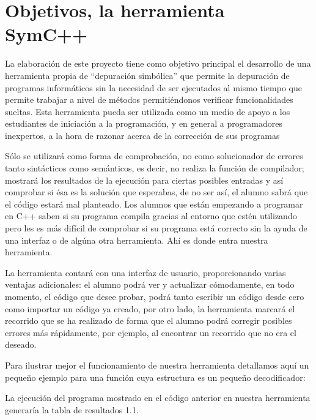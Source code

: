 \section{Objetivos, la herramienta SymC++}

La elaboraci\'on de este proyecto tiene como objetivo principal el desarrollo de una herramienta propia de ``depuraci\'on simb\'olica'' que permite la depuraci\'on de programas inform\'aticos sin la necesidad de ser ejecutados al mismo tiempo que permite trabajar a nivel de m\'etodos permiti\'endonos verificar funcionalidades sueltas. Esta herramienta pueda ser utilizada como un medio de apoyo a los estudiantes de iniciaci\'on a la programaci\'on, y en general a programadores inexpertos, a la hora de razonar acerca de la correcci\'on de sus programas

S\'olo se utilizar\'a como forma de comprobaci\'on, no como solucionador de errores tanto sint\'acticos como sem\'anticos, es decir, no realiza la funci\'on de compilador; mostrar\'a los resultados de la ejecuci\'on para ciertas posibles entradas y as\'i comprobar si \'esa es la soluci\'on que esperabas, de no ser as\'i, el alumno sabr\'a que el c\'odigo estar\'a mal planteado. Los alumnos que est\'an empezando a programar en C++ saben si su programa compila gracias al entorno que est\'en utilizando pero les es m\'as dif\'icil de comprobar si su programa est\'a correcto sin la ayuda de una interfaz o de alg\'una otra herramienta. Ah\'i es donde entra nuestra herramienta.

La herramienta contar\'a con una interfaz de usuario, proporcionando varias ventajas adicionales: el alumno podr\'a ver y actualizar c\'omodamente, en todo momento, el c\'odigo que desee probar, podr\'a tanto escribir un c\'odigo desde cero como importar un c\'odigo ya creado, por otro lado, la herramienta marcar\'a el recorrido que se ha realizado de forma que el alumno podr\'a corregir posibles errores m\'as r\'apidamente, por ejemplo, al encontrar un recorrido que no era el deseado.

Para ilustrar mejor el funcionamiento de nuestra herramienta detallamos aqu\'i un peque\~no ejemplo para una funci\'on cuya estructura es un peque\~no decodificador:



La ejecuci\'on del programa mostrado en el c\'odigo anterior en nuestra herramienta generar\'ia la tabla de resultados 1.1.


